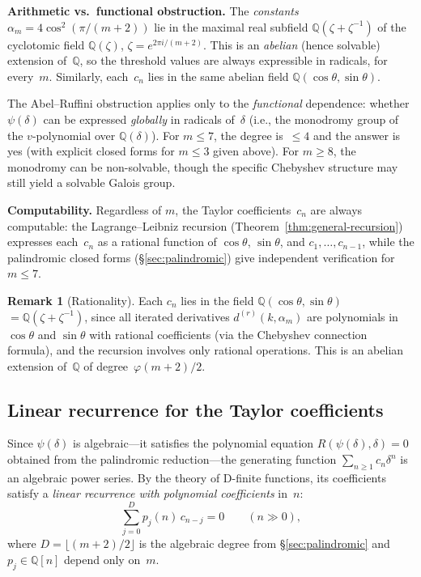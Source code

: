 \documentclass[11pt,a4paper]{article}
\theoremstyle{plain}
\theoremstyle{definition}
\newtheorem{remark}[theorem]{Remark}
\newcommand{\alpham}{\alpha_m}
\begin{document}
\medskip
\noindent\textbf{Arithmetic vs.\ functional obstruction.}
The \emph{constants} $\alpha_m = 4\cos^2(\pi/(m{+}2))$ lie in the
maximal real subfield $\mathbb{Q}(\zeta + \zeta^{-1})$ of the cyclotomic
field $\mathbb{Q}(\zeta)$, $\zeta = e^{2\pi i/(m+2)}$.  This is an
\emph{abelian} (hence solvable) extension of~$\mathbb{Q}$, so the
threshold values are always expressible in radicals, for every~$m$.
Similarly, each~$c_n$ lies in the same abelian field
$\mathbb{Q}(\cos\theta, \sin\theta)$.

The Abel--Ruffini obstruction applies only to the \emph{functional}
dependence: whether $\psi(\delta)$ can be expressed \emph{globally} in
radicals of~$\delta$ (i.e., the monodromy group of the $v$-polynomial
over $\mathbb{Q}(\delta)$).  For $m \le 7$, the degree is~$\le 4$
and the answer is yes (with explicit closed forms for $m \le 3$ given
above).  For $m \ge 8$, the monodromy can be non-solvable, though the
specific Chebyshev structure may still yield a solvable Galois group.

\medskip
\noindent\textbf{Computability.}
Regardless of $m$, the Taylor coefficients~$c_n$ are always computable:
the Lagrange--Leibniz recursion
(Theorem~\ref{thm:general-recursion}) expresses each~$c_n$ as a
rational function of $\cos\theta$, $\sin\theta$, and
$c_1, \ldots, c_{n-1}$, while the palindromic closed forms
(\S\ref{sec:palindromic}) give independent verification for
$m \le 7$.

\begin{remark}[Rationality]
Each $c_n$ lies in the field $\mathbb{Q}(\cos\theta, \sin\theta)$
$= \mathbb{Q}(\zeta + \zeta^{-1})$,
since all iterated derivatives
$d^{(r)}(k, \alpham)$ are polynomials in $\cos\theta$ and
$\sin\theta$ with rational coefficients (via the Chebyshev
connection formula), and the recursion involves only
rational operations.  This is an abelian extension of~$\mathbb{Q}$
of degree~$\varphi(m{+}2)/2$.
\end{remark}

\subsection{Linear recurrence for the Taylor coefficients}
\label{sec:recurrence}

Since $\psi(\delta)$ is algebraic---it satisfies the polynomial equation
$R(\psi(\delta), \delta) = 0$ obtained from the palindromic reduction---the
generating function $\sum_{n \ge 1} c_n \delta^n$ is an algebraic power
series.  By the theory of D-finite functions, its coefficients satisfy a
\emph{linear recurrence with polynomial coefficients} in~$n$:
\begin{equation}\label{eq:recurrence}
  \sum_{j=0}^{D} p_j(n) \, c_{n-j} = 0 \qquad (n \gg 0),
\end{equation}
where $D = \lfloor (m+2)/2 \rfloor$ is the algebraic degree from
\S\ref{sec:palindromic} and $p_j \in \mathbb{Q}[n]$ depend only on~$m$.
\end{document}
